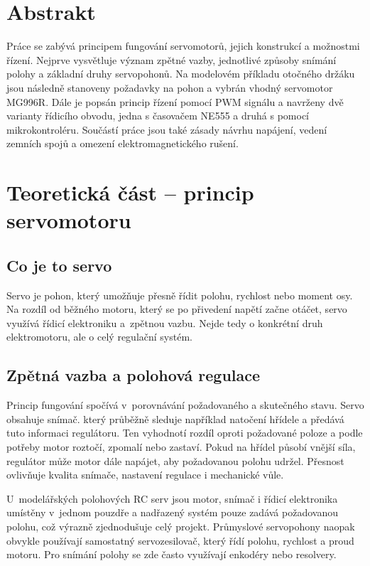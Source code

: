 \chapter*{Abstrakt}
Práce se zabývá principem fungování servomotorů, jejich konstrukcí a možnostmi řízení. Nejprve vysvětluje význam zpětné vazby, jednotlivé způsoby snímání polohy a základní druhy servopohonů. Na modelovém příkladu otočného držáku jsou následně stanoveny požadavky na pohon a vybrán vhodný servomotor MG996R. Dále je popsán princip řízení pomocí PWM signálu a navrženy dvě varianty řídicího obvodu, jedna s časovačem NE555 a druhá s pomocí mikrokontroléru. Součástí práce jsou také zásady návrhu napájení, vedení zemních spojů a omezení elektromagnetického rušení.


\chapter{Teoretická část -- princip servomotoru}
\section{Co je to servo}
Servo je pohon, který umožňuje přesně řídit polohu, rychlost nebo moment osy. Na rozdíl od běžného motoru, který se po přivedení napětí začne otáčet, servo využívá řídicí elektroniku a~zpětnou vazbu. Nejde tedy o konkrétní druh elektromotoru, ale o celý regulační systém.

\section{Zpětná vazba a polohová regulace}
Princip fungování spočívá v~porovnávání požadovaného a skutečného stavu. Servo obsahuje snímač. který průběžně sleduje například natočení hřídele a předává tuto informaci regulátoru. Ten vyhodnotí rozdíl oproti požadované poloze a podle potřeby motor roztočí, zpomalí nebo zastaví. Pokud na hřídel působí vnější síla, regulátor může motor dále napájet, aby požadovanou polohu udržel. Přesnost ovlivňuje kvalita snímače, nastavení regulace i mechanické vůle.

U~modelářských polohových RC serv jsou motor, snímač i řídicí elektronika umístěny v~jednom pouzdře a nadřazený systém pouze zadává požadovanou polohu, což výrazně zjednodušuje celý projekt. Průmyslové servopohony naopak obvykle používají samostatný servozesilovač, který řídí polohu, rychlost a proud motoru. Pro snímání polohy se zde často využívají enkodéry nebo resolvery.~\cite{omron}

